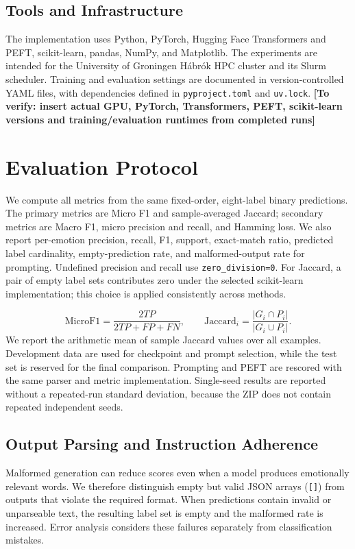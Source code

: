 \documentclass[11pt,a4paper]{article}
\newcommand{\todo}[1]{\textcolor{red!65!black}{\textbf{[To verify: #1]}}}
\newcommand{\metric}[1]{\ensuremath{\mathrm{#1}}}
\begin{document}
\subsection{Tools and Infrastructure}
The implementation uses Python, PyTorch, Hugging Face Transformers and PEFT, scikit-learn, pandas, NumPy, and Matplotlib. The experiments are intended for the University of Groningen H\'abr\'ok HPC cluster and its Slurm scheduler. Training and evaluation settings are documented in version-controlled YAML files, with dependencies defined in \texttt{pyproject.toml} and \texttt{uv.lock}. \todo{insert actual GPU, PyTorch, Transformers, PEFT, scikit-learn versions and training/evaluation runtimes from completed runs}

\section{Evaluation Protocol}
We compute all metrics from the same fixed-order, eight-label binary predictions. The primary metrics are Micro F1 and sample-averaged Jaccard; secondary metrics are Macro F1, micro precision and recall, and Hamming loss. We also report per-emotion precision, recall, F1, support, exact-match ratio, predicted label cardinality, empty-prediction rate, and malformed-output rate for prompting. Undefined precision and recall use \texttt{zero\_division=0}. For Jaccard, a pair of empty label sets contributes zero under the selected scikit-learn implementation; this choice is applied consistently across methods.

\begin{equation}
\metric{MicroF1}=\frac{2TP}{2TP+FP+FN},\qquad
\metric{Jaccard}_{i}=\frac{|G_i\cap P_i|}{|G_i\cup P_i|}.
\end{equation}
We report the arithmetic mean of sample Jaccard values over all examples. Development data are used for checkpoint and prompt selection, while the test set is reserved for the final comparison. Prompting and PEFT are rescored with the same parser and metric implementation. Single-seed results are reported without a repeated-run standard deviation, because the ZIP does not contain repeated independent seeds.

\subsection{Output Parsing and Instruction Adherence}
Malformed generation can reduce scores even when a model produces emotionally relevant words. We therefore distinguish empty but valid JSON arrays (\texttt{[]}) from outputs that violate the required format. When predictions contain invalid or unparseable text, the resulting label set is empty and the malformed rate is increased. Error analysis considers these failures separately from classification mistakes.
\end{document}
